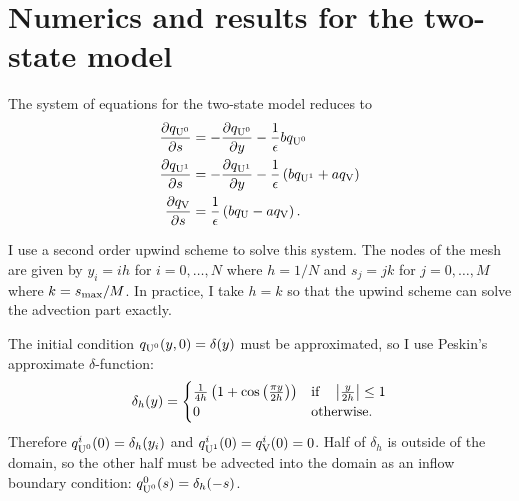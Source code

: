 \documentclass{article}
\newcommand{\tn}{\textnormal}
\newcommand{\dd}{d}
\newcommand{\Der}[2]{\frac{\dd #1}{\dd #2}}
\newcommand{\Pder}[2]{\frac{\partial #1}{\partial #2}}
\begin{document}
\section{Numerics and results for the two-state model}
\label{sec:res-unpr}

The system of equations for the two-state model reduces to
\begin{align}
  \label{eq:unprimed-1}
  \Pder{q_{\tn{U}^0}}{s} &= -\Pder{q_{\tn{U}^0}}{y} -
                           \frac{1}{\epsilon} b q_{\tn{U}^0} \\ 
  \label{eq:unprimed-2}
  \Pder{q_{\tn{U}^1}}{s} &= -\Pder{q_{\tn{U}^1}}{y} -
                           \frac{1}{\epsilon} 
                           \left(b q_{\tn{U}^1} + a q_\tn{V}\right) \\
  \label{eq:unprimed-3}
  \Pder{q_\tn{V}}{s} &= \frac{1}{\epsilon} \left(b q_\tn{U} - a
                       q_\tn{V}\right).
\end{align}

I use a second order upwind scheme to solve this system. The nodes of
the mesh are given by $y_i = ih$ for $i = 0, \hdots, N$ where
$h = 1/N$ and $s_j = jk$ for $j = 0, \hdots, M$ where $k =
s_\tn{max}/M$. In practice, I take $h = k$ so that the upwind scheme
can solve the advection part exactly.


The initial condition $q_{\tn{U}^0}(y, 0) = \delta(y)$ must be
approximated, so I use Peskin's approximate $\delta$-function:
\begin{equation}
  \label{eq:delta-h}
  \delta_h(y) =
  \begin{cases}
    \frac{1}{4h} \left( 1 + \cos\left(\frac{\pi y}{2h}\right) \right)
    & \tn{if} \quad \left|\frac{y}{2h}\right| \le 1 \\
    0 & \tn{otherwise.}
  \end{cases}
\end{equation}
Therefore $q_{\tn{U}^0}^i(0) = \delta_h(y_i)$ and
$q_{\tn{U}^1}^i(0) = q_\tn{V}^i(0) = 0$. Half of $\delta_h$ is outside
of the domain, so the other half must be advected into the domain as
an inflow boundary condition: $q_{\tn{U}^0}^0(s) = \delta_h(-s)$.
\end{document}
